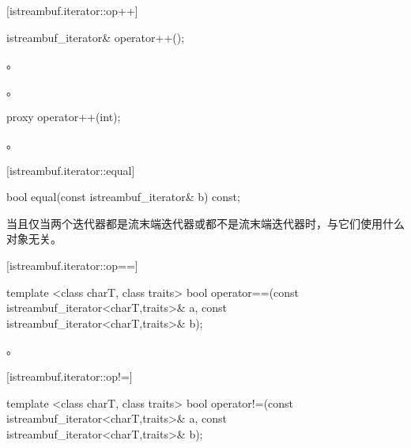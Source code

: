 [istreambuf.iterator::op++]{}

%
\begin{itemdecl}
istreambuf_iterator& operator++();
\end{itemdecl}

\begin{itemdescr}
\pnum
\effects
{}。

\pnum
\returns
{}。
\end{itemdescr}

%
%
\begin{itemdecl}
proxy operator++(int);
\end{itemdecl}

\begin{itemdescr}
\pnum
\returns
{}。
\end{itemdescr}

[istreambuf.iterator::equal]{}

%
\begin{itemdecl}
bool equal(const istreambuf_iterator& b) const;
\end{itemdecl}

\begin{itemdescr}
\pnum
\returns
{}当且仅当两个迭代器都是流末端迭代器或都不是流末端迭代器时，与它们使用什么对象无关。
\end{itemdescr}

[istreambuf.iterator::op==]{}

%
\begin{itemdecl}
template <class charT, class traits>
  bool operator==(const istreambuf_iterator<charT,traits>& a,
                  const istreambuf_iterator<charT,traits>& b);
\end{itemdecl}

\begin{itemdescr}
\pnum
\returns
{}。
\end{itemdescr}

[istreambuf.iterator::op!=]{}

%
\begin{itemdecl}
template <class charT, class traits>
  bool operator!=(const istreambuf_iterator<charT,traits>& a,
                  const istreambuf_iterator<charT,traits>& b);
\end{itemdecl}

